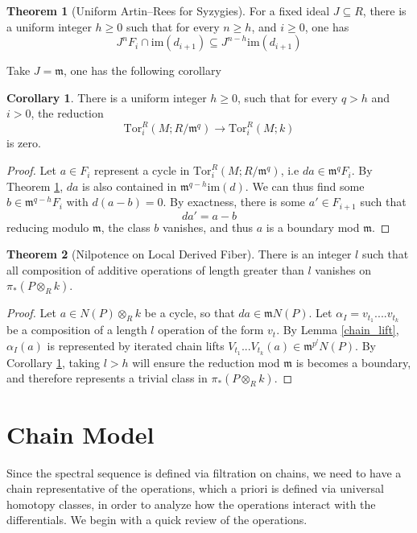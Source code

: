 \documentclass{article}
\newcommand{\Tor}{\textrm{Tor}}
\theoremstyle{definition}
\newtheorem{theorem}{Theorem}[section]
\theoremstyle{definition}
\theoremstyle{definition}
\theoremstyle{definition}
\theoremstyle{definition}
\theoremstyle{definition}
\theoremstyle{definition}
\newtheorem{corollary}{Corollary}[theorem]
\theoremstyle{definition}
\begin{document}
\begin{theorem}[Uniform Artin–Rees for Syzygies]
\label{Uniform}
For a fixed ideal $J\subseteq R$, there is a uniform integer $h\geq 0$ such that for every $n\geq h$, and $i\geq 0$, one has 
    \[J^nF_i\cap \textrm{im}(d_{i+1})\subseteq J^{n-h}\textrm{im}(d_{i+1})\]
\end{theorem}




Take $J=\mathfrak{m}$, one has the following corollary
\begin{corollary}
\label{tor_reduction}
    There is a uniform integer $h\geq 0$, such that for every $q> h$ and $i> 0$, the reduction
    \[\Tor_i^R(M;R/\mathfrak{m}^q)\to \Tor_i^R(M;k) \]
    is zero.
\end{corollary}
\begin{proof}
    Let $a\in F_i$ represent a cycle in $\Tor_i^R(M; R/\mathfrak{m}^q)$, i.e $da\in \mathfrak{m}^qF_i$. By Theorem \ref{Uniform}, $da$ is also contained in $\mathfrak{m}^{q-h} \textrm{im}(d)$. We can thus find some $b\in \mathfrak{m}^{q-h}F_i$ with $d(a-b)=0$. By exactness, there is some $a'\in F_{i+1}$ such that 
    \[da'=a-b\]
    reducing modulo $\mathfrak{m}$, the class $b$ vanishes, and thus $a$ is a boundary mod $\mathfrak{m}$.
\end{proof}

\begin{theorem}[Nilpotence on Local Derived Fiber]
    There is an integer $l$ such that all composition of additive operations of length greater than $l$ vanishes on $\pi_* (P\otimes_R k)$.
\end{theorem}
\begin{proof}
    Let $a\in N(P)\otimes_R k$ be a cycle, so that $da\in \mathfrak{m}N(P)$.  Let $\alpha_I =v_{t_1}....v_{t_k}$ be a composition of a length $l$ operation of the form $v_t$. By Lemma \ref{chain_lift}, $\alpha_I(a)$ is represented by iterated chain lifts $V_{t_1}...V_{t_k}(a)\in \mathfrak{m}^{p^l}N(P)$. By Corollary \ref{tor_reduction}, taking $l>h$ will ensure the reduction mod $\mathfrak{m}$ is becomes a boundary, and therefore represents a trivial class in $\pi_*(P\otimes_R k)$.


\end{proof}





\section{Chain Model}
Since the spectral sequence is defined via filtration on chains, we need to have a chain representative of the operations, which a priori is defined via universal homotopy classes, in order to analyze how the operations interact with the differentials. We begin with a quick review of the operations.
\end{document}
